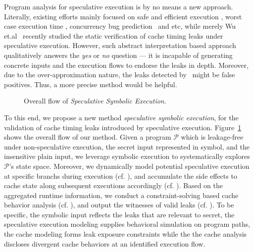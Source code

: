 \documentclass[sigconf, review]{acmart}
\newcommand*\circled[1]{\tikz[baseline=(char.base)]{
				\node[shape=circle,draw,inner sep=.4pt] (char) {\scriptsize{#1}};}}
\newcommand{\prog}{\mathcal{P}}
\begin{document}
Program analysis for speculative execution is by no means a new approach. 
Literally, existing efforts mainly focused on safe and efficient execution
\cite{ChenLDHY04,PrabhuRV10,GuarnieriKMRS19}, worst case execution time 
\cite{LiMR03,LiMR05}, concurrency bug prediction~\cite{ChenWYS09,LiELS05} 
and etc, while merely Wu et.al~\cite{WuW19} recently studied the static 
verification of cache timing leaks under speculative execution. However, 
such abstract interpretation based approach~\cite{WuW19} qualitatively 
answers the \textit{yes} or \textit{no} question --- it is incapable of 
generating concrete inputs and the execution flows to endorse the leaks 
in depth. Moreover, due to the over-approximation nature, the leaks 
detected by~\cite{WuW19} might be false positives. Thus, a more precise
method would be helpful.


\begin{figure}
  \vspace{1ex}
  \centering
  \scalebox{0.95}{}
  \caption{Overall flow of \emph{Speculative Symbolic Execution}.}
  \label{fig:overall_flow}
\end{figure}


To this end, we propose a new method \textit{speculative symbolic execution}, 
for the validation of cache timing leaks introduced by speculative execution. 
Figure~\ref{fig:overall_flow} shows the overall flow of our method. Given a 
program $\prog$ which is leakage-free under non-speculative execution, the 
secret input represented in symbol, and the insensitive plain input, we 
leverage symbolic execution to systematically explores $\prog$'s state space. 
Moreover, we dynamically model potential speculative execution at specific 
branchs during execution (cf. \circled{1}), and accumulate the side effects 
to cache state along subsequent executions accordingly (cf. \circled{2}). 
Based on the aggregated runtime information, we conduct a constraint-solving 
based cache behavior analysis (cf. \circled{3}), and output the witnesses of 
valid leaks (cf. \circled{4}). To be specific, the symbolic input reflects the 
leaks that are relevant to secret, the speculative execution modeling supplies 
behavioral simulation on program paths, the cache modeling forms leak exposure 
constraints while the the cache analysis discloses divergent cache behaviors at 
an identified execution flow. 
\end{document}

